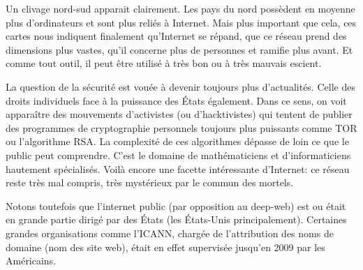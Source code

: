 \documentclass[article, french]{yReport}
\begin{document}
	Un clivage nord-sud apparait clairement. Les pays du nord possèdent en moyenne plus d'ordinateurs et sont plus reliés à Internet. Mais plus important que cela, ces cartes nous indiquent finalement qu'Internet se répand, que ce réseau prend des dimensions plus vastes, qu'il concerne plus de personnes et ramifie plus avant. Et comme tout outil, il peut être utilisé à très bon ou à très mauvais escient.
	
	La question de la sécurité est vouée à devenir toujours plus d'actualités. Celle des droits individuels face à la puissance des États également. Dans ce sens, on voit apparaître des mouvements d'activistes (ou d'hacktivistes) qui tentent de publier des programmes de cryptographie personnels toujours plus puissants comme TOR ou l'algorithme RSA. La complexité de ces algorithmes dépasse de loin ce que le public peut comprendre. C'est le domaine de mathématiciens et d'informaticiens hautement spécialisés. Voilà encore une facette intéressante d'Internet: ce réseau reste très mal compris, très mystérieux par le commun des mortels.
	
	Notons toutefois que l'internet public (par opposition au deep-web) est ou était en grande partie dirigé par des États (les États-Unis principalement). Certaines grandes organisations comme l'ICANN, chargée de l'attribution des noms de domaine (nom des site web), était en effet supervisée jusqu'en 2009 par les Américains.
	
\end{document}
